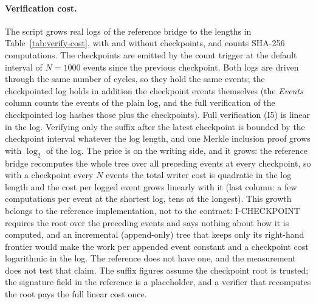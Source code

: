 \paragraph{Verification cost.} The script grows real logs of the
reference bridge to the lengths in Table~\ref{tab:verify-cost}, with and
without checkpoints, and counts SHA-256 computations. The checkpoints
are emitted by the count trigger at the default interval of $N=1000$
events since the previous checkpoint. Both logs are driven through the
same number of cycles, so they hold the same events; the checkpointed
log holds in addition the checkpoint events themselves (the
\emph{Events} column counts the events of the plain log, and the full
verification of the checkpointed log hashes those plus the
checkpoints). Full verification (I5) is linear in the log. Verifying
only the suffix after the latest checkpoint is bounded by the
checkpoint interval whatever the log length, and one Merkle inclusion
proof grows with $\log_2$ of the log. The price is on the writing side,
and it grows: the reference bridge recomputes the whole tree over all
preceding events at every checkpoint, so with a checkpoint every $N$
events the total writer cost is quadratic in the log length and the cost
per logged event grows linearly with it (last column: a few
computations per event at the shortest log, tens at the longest). This
growth belongs to the reference implementation, not to the contract:
I-CHECKPOINT requires the root over the preceding events and says
nothing about how it is computed, and an incremental (append-only) tree
that keeps only its right-hand frontier would make the work per
appended event constant and a checkpoint cost logarithmic in the log.
The reference does not have one, and the measurement does not test that
claim. The suffix figures assume the checkpoint root is
trusted; the signature field in the reference is a placeholder, and a verifier that recomputes the root
pays the full linear cost once.


